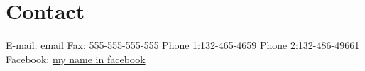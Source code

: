 \documentclass[a4paper, 12pt]{article}
\begin{document}
\section*{Contact}

E-mail: \href{youremail@mail.com}{email} \newline
Fax: 555-555-555-555\newline
Phone 1:132-465-4659\newline
Phone 2:132-486-49661 \newline
Facebook: \href{https://www.facebook.com/}{my name in facebook}
\nocite{york}
\nocite{wong2016write}
\nocite{iqbal2007learning}
\nocite{nte2006research}
\nocite{sudheesh2016write}


\newpage


\end{document}
